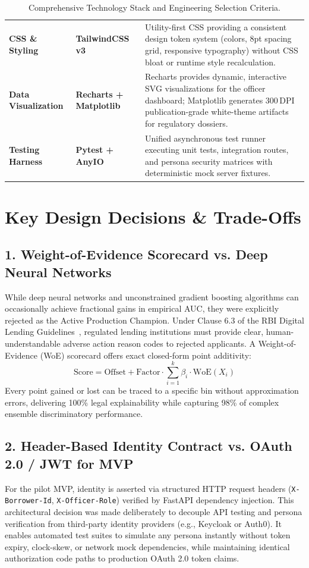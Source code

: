 \documentclass[11pt,a4paper,oneside]{report}
\begin{document}
\begin{table}[H]
\begin{tabularx}{\textwidth}{p{2.8cm} p{3.2cm} X}
  \addlinespace
  \textbf{CSS \& Styling} & \textbf{TailwindCSS v3} & Utility-first CSS providing a consistent design token system (colors, 8pt spacing grid, responsive typography) without CSS bloat or runtime style recalculation. \\
  \addlinespace
  \textbf{Data Visualization} & \textbf{Recharts + Matplotlib} & Recharts provides dynamic, interactive SVG visualizations for the officer dashboard; Matplotlib generates 300\,DPI publication-grade white-theme artifacts for regulatory dossiers. \\
  \addlinespace
  \textbf{Testing Harness} & \textbf{Pytest + AnyIO} & Unified asynchronous test runner executing unit tests, integration routes, and persona security matrices with deterministic mock server fixtures. \\
  \bottomrule
\end{tabularx}
\caption{Comprehensive Technology Stack and Engineering Selection Criteria.}
\label{tab:tech_stack_matrix}
\end{table}

\section{Key Design Decisions \& Trade-Offs}

\subsection{1. Weight-of-Evidence Scorecard vs. Deep Neural Networks}
While deep neural networks and unconstrained gradient boosting algorithms can occasionally achieve fractional gains in empirical AUC, they were explicitly rejected as the Active Production Champion. Under Clause 6.3 of the RBI Digital Lending Guidelines~\cite{rbi_dlg_2022}, regulated lending institutions must provide clear, human-understandable adverse action reason codes to rejected applicants. A Weight-of-Evidence (WoE) scorecard offers exact closed-form point additivity:
$$\text{Score} = \text{Offset} + \text{Factor} \cdot \sum_{i=1}^{k} \beta_i \cdot \text{WoE}(X_i)$$
Every point gained or lost can be traced to a specific bin without approximation errors, delivering 100\% legal explainability while capturing 98\% of complex ensemble discriminatory performance.

\subsection{2. Header-Based Identity Contract vs. OAuth 2.0 / JWT for MVP}
For the pilot MVP, identity is asserted via structured HTTP request headers (\texttt{X-Borrower-Id}, \texttt{X-Officer-Role}) verified by FastAPI dependency injection. This architectural decision was made deliberately to decouple API testing and persona verification from third-party identity providers (e.g., Keycloak or Auth0). It enables automated test suites to simulate any persona instantly without token expiry, clock-skew, or network mock dependencies, while maintaining identical authorization code paths to production OAuth 2.0 token claims.
\end{document}

